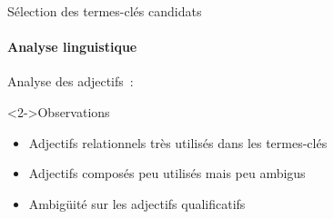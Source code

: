   \begin{frame}[t]{Sélection des termes-clés candidats}\framesubtitle{Analyse linguistique}
    Analyse des adjectifs~:

    \begin{table}
      \centering
      \caption{Taux d'adjectifs dans les termes-clés}
    \end{table}

    \begin{table}
      \centering
      \caption{Taux d'adjectifs dans les documents}
    \end{table}

    \begin{block}<2->{Observations}
      \begin{itemize}
        \item<2->{Adjectifs relationnels très utilisés dans les termes-clés}
        \item<3->{Adjectifs composés peu utilisés mais peu ambigus}
        \item<4->{Ambigüité sur les adjectifs qualificatifs}
      \end{itemize}
    \end{block}
  \end{frame}

